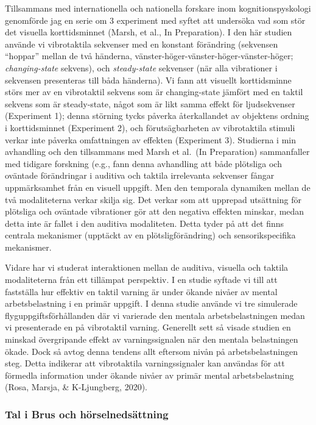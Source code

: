 \documentclass[]{article}
\begin{document}
Tillsammans med internationella och nationella forskare inom
kognitionspyskologi genomförde jag en serie om 3 experiment med syftet
att undersöka vad som stör det visuella korttidsminnet (Marsh, et al.,
In Preparation). I den här studien använde vi vibrotaktila sekvenser med
en konstant förändring (sekvensen ``hoppar'' mellan de två händerna,
vänster-höger-vänster-höger-vänster-höger; \emph{changing-state}
sekvens), och \emph{steady-state} sekvenser (när alla vibrationer i
sekvensen presenteras till båda händerna). Vi fann att visuellt
korttidsminne störs mer av en vibrotaktil sekvens som är changing-state
jämfört med en taktil sekvens som är steady-state, något som är likt
samma effekt för ljudsekvenser (Experiment 1); denna störning tycks
påverka återkallandet av objektens ordning i korttidsminnet (Experiment
2), och förutsägbarheten av vibrotaktila stimuli verkar inte påverka
omfattningen av effekten (Experiment 3). Studierna i min avhandling och
den tillsammans med Marsh et al.~(In Preparation) sammanfaller med
tidigare forskning (e.g., fann denna avhandling att både plötsliga och
oväntade förändringar i auditiva och taktila irrelevanta sekvenser
fångar uppmärksamhet från en visuell uppgift. Men den temporala
dynamiken mellan de två modaliteterna verkar skilja sig. Det verkar som
att upprepad utsättning för plötsliga och oväntade vibrationer gör att
den negativa effekten minskar, medan detta inte är fallet i den auditiva
modaliteten. Detta tyder på att det finns centrala mekanismer (upptäckt
av en plötsligförändring) och sensorikspecifika mekanismer.

Vidare har vi studerat interaktionen mellan de auditiva, visuella och
taktila modaliteterna från ett tillämpat perspektiv. I en studie syftade
vi till att fastställa hur effektiv en taktil varning är under ökande
nivåer av mental arbetsbelastning i en primär uppgift. I denna studie
använde vi tre simulerade flyguppgiftsförhållanden där vi varierade den
mentala arbetsbelastningen medan vi presenterade en på vibrotaktil
varning. Generellt sett så visade studien en minskad övergripande effekt
av varningssignalen när den mentala belastningen ökade. Dock så avtog
denna tendens allt eftersom nivån på arbetsbelastningen steg. Detta
indikerar att vibrotaktila varningssignaler kan användas för att
förmedla information under ökande nivåer av primär mental
arbetsbelastning (Rosa, Marsja, \& K-Ljungberg, 2020).

\hypertarget{tal-i-brus-och-huxf6rselnedsuxe4ttning}{%
\subsubsection{Tal i Brus och
hörselnedsättning}\label{tal-i-brus-och-huxf6rselnedsuxe4ttning}}
\end{document}
